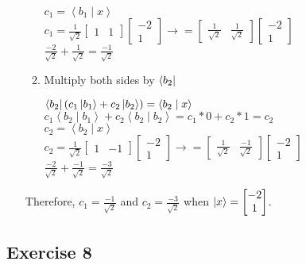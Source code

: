 \documentclass[12pt]{article}
\theoremstyle{plain}
\theoremstyle{nonumberplain}
\theoremstyle{plain}
\theoremstyle{nonumberplain}
\newcommand\1{{\bf 1}}
\newcommand{\bmat}[1]{\begin{bmatrix*} #1 \end{bmatrix*}} %
\newcommand{\<}{\left\langle}
\renewcommand{\>}{\right\rangle}
\newcommand{\inp}[2]{\left\langle#1\mid #2\right\rangle} %
\begin{document}
\begin{enumerate}[label=(\alph*)]
\begin{enumerate}[label=(\roman*)]
\begin{center}
		$c_1=\inp{b_1}{x}$ \\
		$c_1=\frac{1}{\sqrt{2}}\bmat{1 & 1}\bmat{-2 \\ 1}\longrightarrow =\bmat{\frac{1}{\sqrt{2}} & \frac{1}{\sqrt{2}}}\bmat{-2 \\ 1}$ \\
		$\frac{-2}{\sqrt{2}}+\frac{1}{\sqrt{2}}=\frac{-1}{\sqrt{2}}$ \\
		\end{center}
		\item Multiply both sides by $\bra{b_2}$
		\begin{center}
		$\bra{b_2}(c_1\ket{b_1}+c_2\ket{b_2})=\inp{b_2}{x}$ \\
		$c_1\inp{b_2}{b_1}+c_2\inp{b_2}{b_2} = c_1*0+c_2*1=c_2$ \\
		$c_2=\inp{b_2}{x}$ \\
		$c_2=\frac{1}{\sqrt{2}}\bmat{1 & -1}\bmat{-2 \\ 1}\longrightarrow =\bmat{\frac{1}{\sqrt{2}} & \frac{-1}{\sqrt{2}}}\bmat{-2 \\ 1}$ \\
		$\frac{-2}{\sqrt{2}}+\frac{-1}{\sqrt{2}}=\frac{-3}{\sqrt{2}}$ \\
		\end{center}
	\end{enumerate}
	Therefore, $c_1=\frac{-1}{\sqrt{2}}$ and $c_2=\frac{-3}{\sqrt{2}}$ when $\ket{x}=\bmat{-2 \\ 1}$.
\end{enumerate}


\subsection{Exercise 8}
\end{document}
